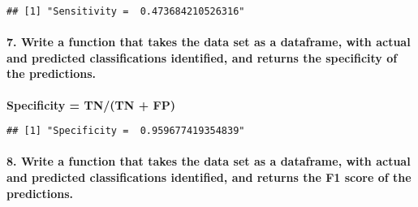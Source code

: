 \documentclass[]{article}
\newenvironment{Shaded}{\begin{snugshade}}{\end{snugshade}}
\newcommand{\ControlFlowTok}[1]{\textcolor[rgb]{0.13,0.29,0.53}{\textbf{#1}}}
\newcommand{\KeywordTok}[1]{\textcolor[rgb]{0.13,0.29,0.53}{\textbf{#1}}}
\newcommand{\NormalTok}[1]{#1}
\newcommand{\OperatorTok}[1]{\textcolor[rgb]{0.81,0.36,0.00}{\textbf{#1}}}
\newcommand{\StringTok}[1]{\textcolor[rgb]{0.31,0.60,0.02}{#1}}
\let\oldparagraph\paragraph
\renewcommand{\paragraph}[1]{\oldparagraph{#1}\mbox{}}
\begin{document}
\begin{verbatim}
## [1] "Sensitivity =  0.473684210526316"
\end{verbatim}

\hypertarget{write-a-function-that-takes-the-data-set-as-a-dataframe-with-actual-and-predicted-classifications-identified-and-returns-the-specificity-of-the-predictions.}{%
\paragraph{7. Write a function that takes the data set as a dataframe,
with actual and predicted classifications identified, and returns the
specificity of the
predictions.}\label{write-a-function-that-takes-the-data-set-as-a-dataframe-with-actual-and-predicted-classifications-identified-and-returns-the-specificity-of-the-predictions.}}

\textbf{Specificity = TN/(TN + FP)}

\begin{Shaded}
\end{Shaded}

\begin{verbatim}
## [1] "Specificity =  0.959677419354839"
\end{verbatim}

\hypertarget{write-a-function-that-takes-the-data-set-as-a-dataframe-with-actual-and-predicted-classifications-identified-and-returns-the-f1-score-of-the-predictions.}{%
\paragraph{8. Write a function that takes the data set as a dataframe,
with actual and predicted classifications identified, and returns the F1
score of the
predictions.}\label{write-a-function-that-takes-the-data-set-as-a-dataframe-with-actual-and-predicted-classifications-identified-and-returns-the-f1-score-of-the-predictions.}}
\end{document}
